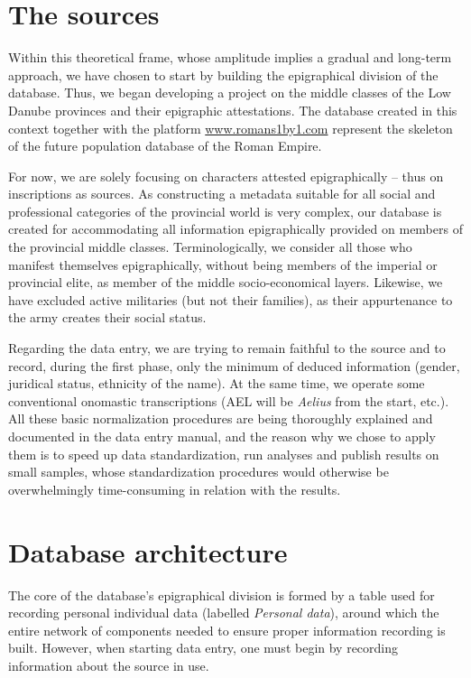 \documentclass[amsthm,ebook]{saparticle}
\begin{document}
\section{The sources}

\noindent Within this theoretical frame, whose amplitude implies a gradual and long-term approach, we have chosen to start by
building the epigraphical division of the database. Thus, we began developing a project on the middle classes of the
Low Danube provinces and their epigraphic attestations. The database created in this context together with the platform
\url{www.romans1by1.com} represent the skeleton of the future population database of the Roman Empire.

For now, we are solely focusing on characters attested epigraphically – thus on inscriptions as sources. As constructing
a metadata suitable for all social and professional categories of the provincial world is very complex, our database is
created for accommodating all information epigraphically provided on members of the provincial middle classes.
Terminologically, we consider all those who manifest themselves epigraphically, without being members of the imperial
or provincial elite, as member of the middle socio-economical layers. Likewise, we have excluded active militaries (but
not their families), as their appurtenance to the army creates their social status.

Regarding the data entry, we are trying to remain faithful to the source and to record, during the first phase, only the
minimum of deduced information (gender, juridical status, ethnicity of the name). At the same time, we operate some
conventional onomastic transcriptions (AEL will be \emph{Aelius} from the start, etc.). All these basic normalization
procedures are being thoroughly explained and documented in the data entry manual, and the reason why we chose to apply
them is to speed up data standardization, run analyses and publish results on small samples, whose standardization
procedures would otherwise be overwhelmingly time-consuming in relation with the results.

\section{Database architecture}

\noindent The core of the database’s epigraphical division is formed by a table used for recording personal
individual data (labelled \emph{Personal data}), around which the entire network of components needed to ensure proper
information recording is built. However, when starting data entry, one must begin by recording information about the
source in use.
\end{document}
